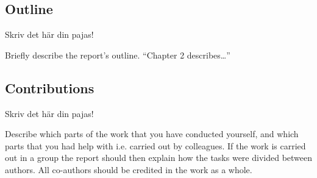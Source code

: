 \iffalse
Examples: “The study has its focus on…. In the survey, the effect of parameter Z is ignored, because…. The survey is distinguished by the evaluation of cases F1 and F2…. The survey's conclusions should however be generally valid for every….”
\fi

\subsection{Outline}
\label{ch:intro:outline}
Skriv det här din pajas!

Briefly describe the report's outline. “Chapter 2 describes…”

\subsection{Contributions}
\label{ch:intro:contributions}
Skriv det här din pajas!

Describe which parts of the work that you have conducted yourself, and which parts that you had help with i.e. carried out by colleagues. If the work is carried out in a group the report should then explain how the tasks were divided between authors. All co-authors should be credited in the work as a whole.
